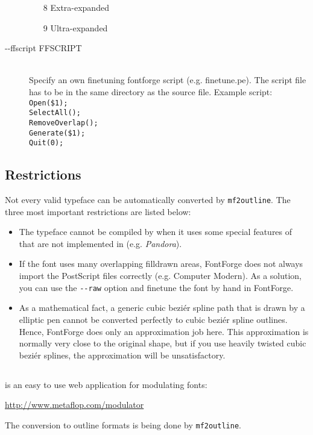 \documentclass{scrartcl}
\begin{document}
\begin{description}
\begin{itemize}
		 	\item[8] Extra-expanded
		 	\item[9] Ultra-expanded
		 \end{itemize}
	\item[ -{}-ffscript FFSCRIPT] \hfill \\
		Specify an own finetuning fontforge script (e.g. finetune.pe). The script file has to be in the same directory as the source file. Example script:\\
		\verb|Open($1);|\\
		\verb|SelectAll();|\\
		\verb|RemoveOverlap();|\\
		\verb|Generate($1);|\\
		\verb|Quit(0);|
\end{description}
%
\subsection{Restrictions}
%
Not every valid \MF{} typeface can be automatically converted by \verb|mf2outline|. The three most important restrictions are listed below:
\begin{itemize}
	\item The \MF{} typeface cannot be compiled by \MP{} when it uses some special features of \MF{} that are not implemented in \MP{} (e.g. \emph{Pandora}).
	\item If the font uses many overlapping filldrawn areas, FontForge does not always import the PostScript files correctly (e.g. Computer Modern). As a solution, you can use the \verb|--raw| option and finetune the font by hand in FontForge.
	\item As a mathematical fact, a generic cubic beziér spline path that is drawn by a elliptic pen cannot be converted perfectly to cubic beziér spline outlines. Hence, FontForge does only an approximation job here. This approximation is normally very close to the original shape, but if you use heavily twisted cubic beziér splines, the approximation will be unsatisfactory.
\end{itemize}
%
\subsection{}
%
 is an easy to use web application for modulating \MF{} fonts:
\begin{center}
	\url{http://www.metaflop.com/modulator}
\end{center}
The conversion to outline formats is being done by \verb|mf2outline|. 
%
\end{document}
